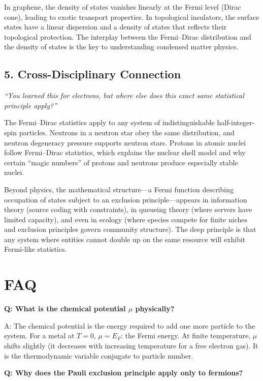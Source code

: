 \documentclass[11pt,openright]{book}
\begin{document}
In graphene, the density of states vanishes linearly at the Fermi level (Dirac cone), leading to exotic transport properties. In topological insulators, the surface states have a linear dispersion and a density of states that reflects their topological protection. The interplay between the Fermi--Dirac distribution and the density of states is the key to understanding condensed matter physics.

\subsection*{5. Cross-Disciplinary Connection}
\textit{``You learned this for electrons, but where else does this exact same statistical principle apply?''}

The Fermi--Dirac statistics apply to any system of indistinguishable half-integer-spin particles. Neutrons in a neutron star obey the same distribution, and neutron degeneracy pressure supports neutron stars. Protons in atomic nuclei follow Fermi--Dirac statistics, which explains the nuclear shell model and why certain ``magic numbers'' of protons and neutrons produce especially stable nuclei.

Beyond physics, the mathematical structure---a Fermi function describing occupation of states subject to an exclusion principle---appears in information theory (source coding with constraints), in queueing theory (where servers have limited capacity), and even in ecology (where species compete for finite niches and exclusion principles govern community structure). The deep principle is that any system where entities cannot double up on the same resource will exhibit Fermi-like statistics.

\section*{FAQ}

\textbf{Q: What is the chemical potential $\mu$ physically?}

A: The chemical potential is the energy required to add one more particle to the system. For a metal at $T = 0$, $\mu = E_F$: the Fermi energy. At finite temperature, $\mu$ shifts slightly (it decreases with increasing temperature for a free electron gas). It is the thermodynamic variable conjugate to particle number.

\textbf{Q: Why does the Pauli exclusion principle apply only to fermions?}
\end{document}
